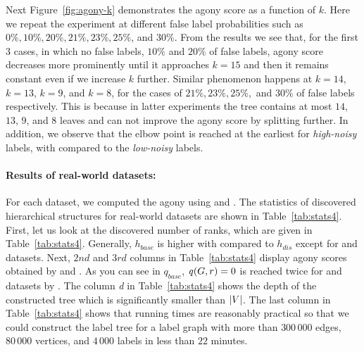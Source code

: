 Next Figure~\ref{fig:agony-k} demonstrates the agony score as a function of $k$.  Here we repeat the experiment at different false label probabilities such as $ 0\%, 10\%, 20\%, 21\%, 23\%, 25\%$, and $30\%$. From the results we see that, for the first $3$ cases,  in which no false labels, $10\%$  and $20\%$ of false labels, agony score decreases
more prominently until it approaches $k=15$ and then it remains constant even if we increase $k$ further. Similar phenomenon happens at $k=14$, $k=13$, $k=9$, and $k=8$, for the cases of $ 21\%, 23\%, 25\%,$ and $30\%$ of  false labels respectively. This is because in latter experiments the tree contains at most $14$, $13$, $9$,  and $8$  leaves and can not improve the agony score by splitting further. In addition, we  observe that the elbow point is reached at the earliest for \emph{high-noisy} labels, with compared to the \emph{low-noisy} labels. 




\paragraph{Results of real-world datasets:}




For each dataset, we computed the agony using \algpartition and \algexact. The statistics of  discovered hierarchical  structures for real-world  datasets  are shown in Table~\ref{tab:stats4}. 
First, let us look at the discovered number of ranks, which are given in Table~\ref{tab:stats4}. 
Generally, $h_{base}$ is higher with compared to $h_{dis}$ except for  and  datasets.
Next, $2nd$ and $3rd$ columns in Table~\ref{tab:stats4} display  agony scores obtained by \algpartition and 
\algexact. As you can see in $q_{base}$, $\score{G, r} = 0$ is reached  twice  for  and  datasets by \algexact. The column \emph{d} in Table~\ref{tab:stats4} shows the depth of the constructed tree which is significantly smaller than ${\left|V\right|}$. The last column in Table~\ref{tab:stats4} shows that running times are reasonably practical so that we could construct the label tree for a label graph with more than $300\,000$ edges, $80\,000$ vertices, and $4\,000$ labels in less than $22$ minutes.

